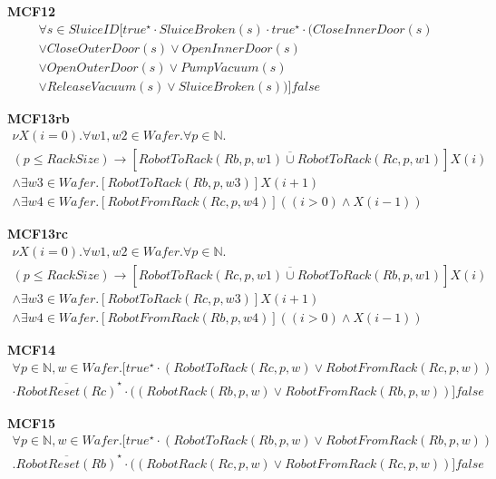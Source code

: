 \documentclass[12pt]{report}
\begin{document}
    \textbf{MCF12}
    \begin{multline*}
        \forall s \in SluiceID [true^{\star} \cdot SluiceBroken(s) \cdot true^{\star} \cdot (CloseInnerDoor(s) \\
        \vee CloseOuterDoor(s) \vee OpenInnerDoor(s) \\
        \vee OpenOuterDoor(s) \vee PumpVacuum(s) \\
        \vee ReleaseVacuum(s) \vee SluiceBroken(s))]false
    \end{multline*}

    \textbf{MCF13rb}
    \begin{multline*}
        \nu X(i=0). \forall w1,w2 \in \mathit{Wafer}. \forall p \in \mathbb{N}. \\
        (p \leq RackSize) \rightarrow [\overline{RobotToRack(Rb,p,w1) \cup RobotToRack(Rc,p,w1)}]X(i) \\
        \wedge \exists w3 \in \mathit{Wafer}. [RobotToRack(Rb,p,w3)]X(i+1) \\
        \wedge \exists w4 \in \mathit{Wafer}. [RobotFromRack(Rc,p,w4)]((i>0) \wedge X(i-1))
    \end{multline*}

    \textbf{MCF13rc}
    \begin{multline*}
        \nu X(i=0). \forall w1,w2 \in \mathit{Wafer}. \forall p \in \mathbb{N}. \\
        (p \leq RackSize) \rightarrow [\overline{RobotToRack(Rc,p,w1) \cup RobotToRack(Rb,p,w1)}]X(i) \\
        \wedge \exists w3 \in \mathit{Wafer}. [RobotToRack(Rc,p,w3)]X(i+1) \\
        \wedge \exists w4 \in \mathit{Wafer}. [RobotFromRack(Rb,p,w4)]((i>0) \wedge X(i-1))
    \end{multline*}

    \textbf{MCF14}
    \begin{multline*}
        \forall p \in \mathbb{N}, w \in \mathit{Wafer}. [true^{\star} \cdot(RobotToRack(Rc,p,w) \vee RobotFromRack(Rc,p,w))\\
        \cdot \overline{RobotReset(Rc)}^{\star} \cdot ((RobotRack(Rb,p,w) \vee RobotFromRack(Rb,p,w))]false
    \end{multline*}

    \textbf{MCF15}
    \begin{multline*}
        \forall p \in \mathbb{N}, w \in \mathit{Wafer}. [true^{\star} \cdot (RobotToRack(Rb,p,w) \vee RobotFromRack(Rb,p,w))\\
        .\overline{RobotReset(Rb)}^{\star} \cdot ((RobotRack(Rc,p,w) \vee RobotFromRack(Rc,p,w))]false
    \end{multline*}
\end{document}
